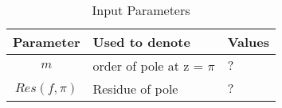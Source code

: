 \begin{table}[ht]
\centering
\setlength{\extrarowheight}{8pt}
\caption{Input Parameters}
\begin{tabular}{|c|l|l|} 
\hline
\textbf{Parameter} & \textbf{Used to denote} & \textbf{Values} \\
\hline
$m$ & order of pole at z = $\pi$  & \multicolumn{1}{|p{1.3cm}|}{\centering $?$ }\\
\hline
$Res(f,\pi)$ & Residue of pole  & \multicolumn{1}{|p{1.3cm}|}{\centering $?$ }\\
\hline
\end{tabular}
 \vspace{4mm}
 \label{tab:cappy}
\end{table}
